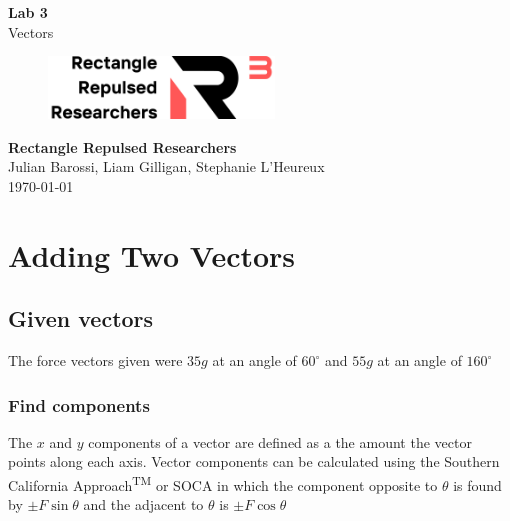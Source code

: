 \documentclass[11pt, letterpaper, includehead]{article}
\begin{document}
\begin{titlepage}
  \begin{center}
    \Huge{\textbf{Lab 3}}\\
    \Huge{Vectors}
    \vfill
    \begin{figure}[H] %
      \centering 
      \includegraphics[width=6cm]{../logo.png}
    \end{figure}
    \large{\textbf{Rectangle Repulsed Researchers}}\\
    \large{Julian Barossi, Liam Gilligan, Stephanie L'Heureux}\\
    \vspace{0.5cm}
    \normalsize
    \today
  \end{center}
\end{titlepage}

\tableofcontents
\pagebreak %

\pagestyle{fancy}
\fancyhead{}

\pagebreak 

\section{Adding Two Vectors} %

\subsection{Given vectors} %
The force vectors given were $35g$ at an angle of $60^{\circ}$ and $55g$ at an angle of $160^{\circ}$

\subsubsection{Find components} %
The $x$ and $y$ components of a vector are defined as a the amount the vector 
points along each axis. Vector components can be calculated using the Southern 
California Approach\textsuperscript{TM} or SOCA in which the component opposite to
$\theta$ is found by $\pm F \sin\theta$ and the adjacent to $\theta$ is $\pm F \cos\theta$
\end{document}
